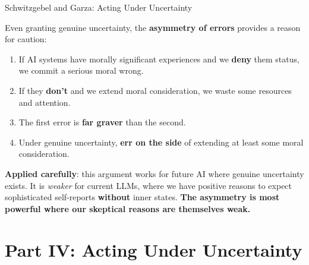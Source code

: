 \documentclass[aspectratio=169,11pt]{beamer}
\begin{document}
\begin{frame}[shrink=5]{Schwitzgebel and Garza: Acting Under Uncertainty}
\begin{argumentbox}
\small
Even granting genuine uncertainty, the \textbf{asymmetry of errors} provides a reason for caution:
\begin{enumerate}
    \item[\textbf{P1}] If AI systems have morally significant experiences and we \textbf{deny} them status, we commit a serious moral wrong.
    \item[\textbf{P2}] If they \textbf{don't} and we extend moral consideration, we waste some resources and attention.
    \item[\textbf{P3}] The first error is \textbf{far graver} than the second.
    \item[\textbf{C}] Under genuine uncertainty, \textbf{err on the side} of extending at least some moral consideration.
\end{enumerate}
\end{argumentbox}

\vspace{0.1cm}
\textbf{Applied carefully}: this argument works for future AI where genuine uncertainty exists. It is \emph{weaker} for current LLMs, where we have positive reasons to expect sophisticated self-reports \textbf{without} inner states. \textbf{The asymmetry is most powerful where our skeptical reasons are themselves weak.}
\end{frame}

\section{Part IV: Acting Under Uncertainty}
\end{document}
